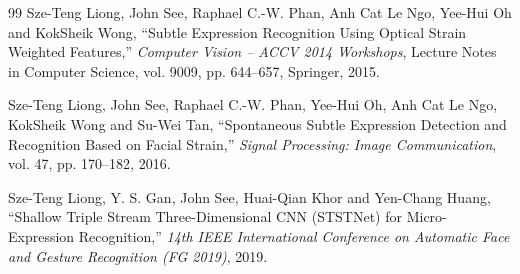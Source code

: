 \documentclass[11pt,a4paper]{article}
\numberwithin{equation}{section}
\begin{document}
\begin{thebibliography}{99}
Sze-Teng Liong, John See, Raphael C.-W. Phan, Anh Cat Le Ngo, Yee-Hui Oh and
KokSheik Wong, ``Subtle Expression Recognition Using Optical Strain Weighted
Features,'' \emph{Computer Vision -- ACCV 2014 Workshops}, Lecture Notes in
Computer Science, vol. 9009, pp. 644--657, Springer, 2015.

Sze-Teng Liong, John See, Raphael C.-W. Phan, Yee-Hui Oh, Anh Cat Le Ngo,
KokSheik Wong and Su-Wei Tan, ``Spontaneous Subtle Expression Detection and
Recognition Based on Facial Strain,'' \emph{Signal Processing: Image
Communication}, vol. 47, pp. 170--182, 2016.

Sze-Teng Liong, Y. S. Gan, John See, Huai-Qian Khor and Yen-Chang Huang,
``Shallow Triple Stream Three-Dimensional CNN (STSTNet) for Micro-Expression
Recognition,'' \emph{14th IEEE International Conference on Automatic Face and
Gesture Recognition (FG 2019)}, 2019.

\end{thebibliography}
\end{document}
